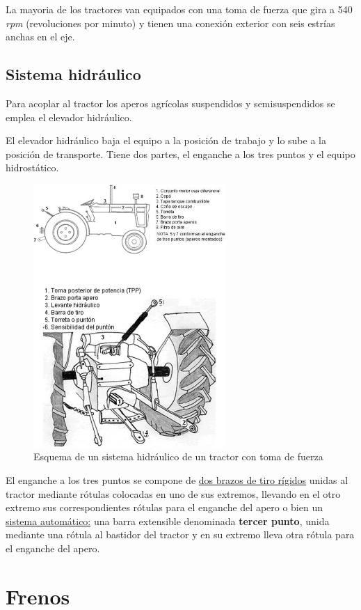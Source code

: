 \documentclass[a4paper,12pt,oneside]{book}
\begin{document}
La mayoria de los tractores van equipados con una toma de fuerza que gira a 540
\emph{rpm} (revoluciones por minuto) y tienen una conexión exterior con seis estrías
anchas en el eje. 
\subsection{Sistema hidráulico}
\label{sec:org70c9df4}
Para acoplar al tractor los aperos agrícolas suspendidos y semisuspendidos se
emplea el elevador hidráulico.

El elevador hidráulico baja el equipo a la posición de trabajo y lo sube a la
posición de transporte. Tiene dos partes, el enganche a los tres puntos y el
equipo hidrostático.
\begin{figure}[htbp]
\centering
\includegraphics[width=0.65\textwidth]{./img_0009/hidraulico.jpg}
\caption{Esquema de un sistema hidráulico de un tractor con toma de fuerza}
\end{figure}

El enganche a los tres puntos se compone de \uline{dos brazos de tiro rígidos} unidas
al tractor mediante rótulas colocadas en uno de sus extremos, llevando en el
otro extremo sus correspondientes rótulas para el enganche del apero o bien un
\uline{sistema automático:} una barra extensible denominada \textbf{tercer punto}, unida
mediante una rótula al bastidor del tractor y en su extremo lleva otra rótula
para el enganche del apero.
\section{Frenos}
\label{sec:org61167e2}
\end{document}
